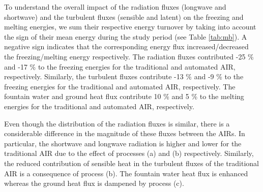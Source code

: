 \documentclass[tc, manuscript]{copernicus}
\begin{document}
To understand the overall impact of the radiation fluxes (longwave and shortwave) and the turbulent fluxes
(sensible and latent) on the freezing and melting energies, we sum their respective energy turnover by taking
into account the sign of their mean energy during the study period (see Table \ref{tab:mb}). A negative sign
indicates that the corresponding energy flux increased/decreased the freezing/melting energy respectively.  The
radiation fluxes contributed -25 \% and -17 \% to the freezing energies for the traditional and automated AIR,
respectively.  Similarly, the turbulent fluxes contribute -13 \% and -9 \% to the freezing energies for the
traditional and automated AIR, respectively. The fountain water and ground heat flux contribute 10 \% and 5 \%
to the melting energies for the traditional and automated AIR, respectively. 

Even though the distribution of the radiation fluxes is similar, there is a considerable difference in the
magnitude of these fluxes between the AIRs. In particular, the shortwave and longwave radiation is higher and
lower for the traditional AIR due to the effect of processes (a) and (b) respectively. Similarly, the reduced
contribution of sensible heat in the turbulent fluxes of the traditional AIR is a consequence of process (b).
The fountain water heat flux is enhanced whereas the ground heat flux is dampened by process (c).
\end{document}
